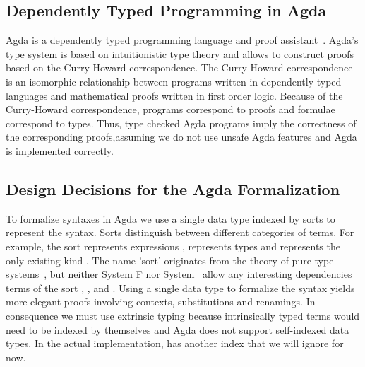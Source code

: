\subsection{Dependently Typed Programming in Agda}
Agda is a dependently typed programming language and proof assistant~\cite{agda}.
Agda's type system is based on intuitionistic type theory and allows to construct proofs based on the Curry-Howard correspondence. 
The Curry-Howard correspondence is an isomorphic relationship between programs written in dependently typed languages and mathematical proofs written in first order logic. 
Because of the Curry-Howard correspondence, programs correspond to proofs and formulae correspond to types. 
Thus, type checked Agda programs imply the correctness of the corresponding proofs,assuming we do not use unsafe Agda features and Agda is implemented correctly. 

\subsection{Design Decisions for the Agda Formalization}
To formalize syntaxes in Agda we use a single data type  indexed by sorts  to represent the syntax. 
Sorts distinguish between different categories of terms.
For example, the sort  represents expressions ,  represents types  and  represents the only existing kind . The name 'sort' originates from the theory of pure type systems~\cite{pts}, but neither System F nor System \Fo\ allow any interesting dependencies terms of the sort , , and .
Using a single data type to formalize the syntax yields more elegant proofs involving contexts, substitutions and renamings. 
In consequence we must use extrinsic typing because intrinsically typed terms      would need to be indexed by themselves and Agda does not support self-indexed data types. 
In the actual implementation,  has another index  that we will ignore for now.

